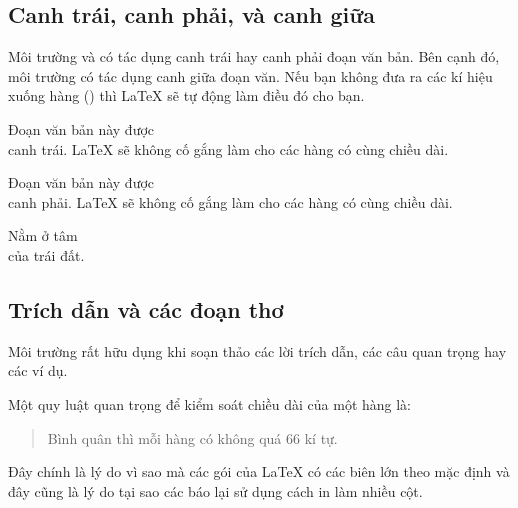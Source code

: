 \subsection{Canh trái, canh phải, và canh giữa}
Môi trường  và  có tác dụng canh trái hay canh phải đoạn văn bản. Bên cạnh đó, môi trường  có tác dụng canh giữa đoạn văn. Nếu bạn không đưa ra các kí hiệu xuống hàng (\ci{\bs}) thì \LaTeX{} sẽ tự động làm điều đó cho bạn.
\begin{example}
\begin{flushleft}
Đoạn văn bản này được\\
canh trái. \LaTeX{} sẽ không
cố gắng làm
cho các hàng có cùng chiều dài.
\end{flushleft}
\end{example}
\begin{example}
\begin{flushright}
Đoạn văn bản này được\\
canh phải. \LaTeX{} sẽ không
cố gắng làm
cho các hàng có cùng chiều dài.
\end{flushright}
\end{example}
\begin{example}
\begin{center}
Nằm ở tâm \\của trái đất.
\end{center}
\end{example}

\subsection{Trích dẫn và các đoạn thơ}
Môi trường  rất hữu dụng khi soạn thảo các lời trích dẫn, các câu quan trọng hay các ví dụ.
\begin{example}
Một quy luật quan trọng
để kiểm soát chiều dài
của một hàng là:
\begin{quote}
Bình quân thì mỗi hàng
có không quá 66 kí tự.
\end{quote}
Đây chính là lý do vì sao
mà các gói của \LaTeX{} có
các biên lớn
theo mặc định và đây cũng
là lý do tại sao các báo
lại sử dụng
cách in làm nhiều cột.
\end{example}

